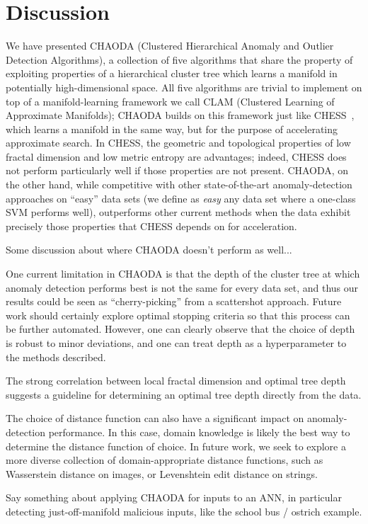 \section{Discussion}
\label{sec:conclusions}

We have presented CHAODA (Clustered Hierarchical Anomaly and Outlier Detection Algorithms), a collection of five algorithms that share the property of exploiting properties of a hierarchical cluster tree which learns a manifold in potentially high-dimensional space.
All five algorithms are trivial to implement on top of a manifold-learning framework we call CLAM (Clustered Learning of Approximate Manifolds); CHAODA builds on this framework just like CHESS~\cite{ishaq2019entropy}, which learns a manifold in the same way, but for the purpose of accelerating approximate search.
In CHESS, the geometric and topological properties of low fractal dimension and low metric entropy are advantages; indeed, CHESS does not perform particularly well if those properties are not present.
CHAODA, on the other hand, while competitive with other state-of-the-art anomaly-detection approaches on ``easy'' data sets (we define as \textit{easy} any data set where a one-class SVM performs well), outperforms other current methods when the data exhibit precisely those properties that CHESS depends on for acceleration.


Some discussion about where CHAODA doesn't perform as well...

One current limitation in CHAODA is that the depth of the cluster tree at which anomaly detection performs best is not the same for every data set, and thus our results could be seen as ``cherry-picking'' from a scattershot approach.
Future work should certainly explore optimal stopping criteria so that this process can be further automated.
However, one can clearly observe that the choice of depth is robust to minor deviations, and one can treat depth as a hyperparameter to the methods described.


The strong correlation between local fractal dimension and optimal tree depth suggests a guideline for determining an optimal tree depth directly from the data.

The choice of distance function can also have a significant impact on anomaly-detection performance.
In this case, domain knowledge is likely the best way to determine the distance function of choice.
In future work, we seek to explore a more diverse collection of domain-appropriate distance functions, such as Wasserstein distance on images, or Levenshtein edit distance on strings. 

Say something about applying CHAODA for inputs to an ANN, in particular detecting just-off-manifold malicious inputs, like the school bus / ostrich example.
